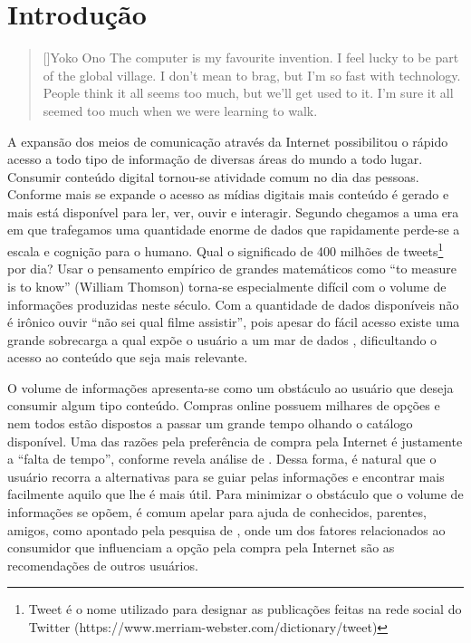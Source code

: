 \chapter{Introdução}
\label{cap:introducao}

\begin{quotation}[]{Yoko Ono}
The computer is my favourite invention. I feel lucky to be part of the global village. I don't mean to brag, but I'm so fast with technology. People think it all seems too much, but we'll get used to it. I'm sure it all seemed too much when we were learning to walk.
\end{quotation}

A expansão dos meios de comunicação através da Internet possibilitou o rápido acesso a todo tipo de informação de diversas áreas do mundo a todo lugar. Consumir conteúdo digital tornou-se atividade comum no dia das pessoas. Conforme mais se expande o acesso as mídias digitais mais conteúdo é gerado e mais está disponível para ler, ver, ouvir e interagir. Segundo \cite{Walker:2014} chegamos a uma era em que trafegamos uma quantidade enorme de dados que rapidamente perde-se a escala e cognição para o humano. Qual o significado de 400 milhões de tweets\footnote{Tweet é o nome utilizado para designar as publicações feitas na rede social do Twitter (https://www.merriam-webster.com/dictionary/tweet)} por dia? Usar o pensamento empírico de grandes matemáticos como “to measure is to know” (William Thomson) torna-se especialmente difícil com o volume de informações produzidas neste século. Com a quantidade de dados disponíveis não é irônico ouvir “não sei qual filme assistir”, pois apesar do fácil acesso existe uma grande sobrecarga a qual expõe o usuário a um mar de dados \citep{Wellman:BigData}, dificultando o acesso ao conteúdo que seja mais relevante.

O volume de informações apresenta-se como um obstáculo ao usuário que deseja consumir algum tipo conteúdo. Compras online possuem milhares de opções e nem todos estão dispostos a passar um grande tempo olhando o catálogo disponível. Uma das razões pela preferência de compra pela Internet é justamente a “falta de tempo”, conforme revela análise de \cite{Mykolas:2015a}. Dessa forma, é natural que o usuário recorra a alternativas para se guiar pelas informações e encontrar mais facilmente aquilo que lhe é mais útil. Para minimizar o obstáculo que o volume de informações se opõem, é comum apelar para ajuda de conhecidos, parentes, amigos, como apontado pela pesquisa de \cite{Mykolas:2015a}, onde um dos fatores relacionados ao consumidor que influenciam a opção pela compra pela Internet são as recomendações de outros usuários.

